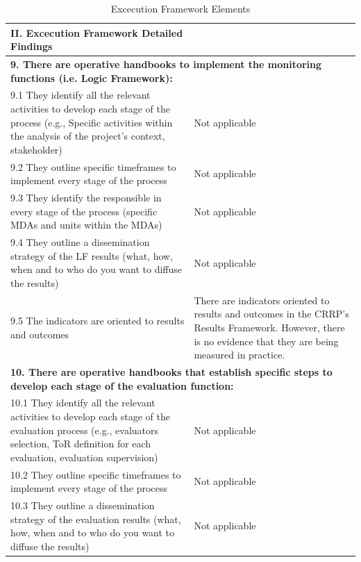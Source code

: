 \documentclass[
  10pt,
]{book}
\begin{document}
\begin{table}
\caption{\label{tab:unnamed-chunk-12}Excecution Framework Elements}
\centering
\begin{tabular}[t]{l|l}
\hline
II. Excecution Framework Detailed Findings &  \\
\hline
\multicolumn{2}{l}{\textbf{9. There are operative handbooks to implement the monitoring functions (i.e. Logic Framework):}}\\
\hline
\hspace{1em}9.1 They identify all the relevant activities to develop each stage of the process (e.g., Specific activities within the analysis of the project's context, stakeholder) & Not applicable\\
\hline
\hspace{1em}9.2 They outline specific timeframes to implement every stage of the process & Not applicable\\
\hline
\hspace{1em}9.3 They identify the responsible in every stage of the process (specific MDAs and units within the MDAs) & Not applicable\\
\hline
\hspace{1em}9.4 They outline a dissemination strategy of the LF results (what, how, when and to who do you want to diffuse the results) & Not applicable\\
\hline
\hspace{1em}9.5 The indicators are oriented to results and outcomes & There are indicators oriented to results and outcomes in the CRRP’s Results Framework. However, there is no evidence that they are being measured in practice.\\
\hline
\multicolumn{2}{l}{\textbf{10. There are operative handbooks that establish specific steps to develop each stage of the evaluation function:}}\\
\hline
\hspace{1em}10.1 They identify all the relevant activities to develop each stage of the evaluation process (e.g., evaluators selection, ToR definition for each evaluation, evaluation supervision) & Not applicable\\
\hline
\hspace{1em}10.2 They outline specific timeframes to implement every stage of the process & Not applicable\\
\hline
\hspace{1em}10.3 They outline a dissemination strategy of the evaluation results (what, how, when and to who do you want to diffuse the results) & Not applicable\\

\end{tabular}
\end{table}
\end{document}

